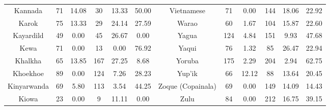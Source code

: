 \begin{tabular}{cccccccccccc}
Kannada & 71 & 14.08 & 30 & 13.33 & 50.00 & Vietnamese & 71 & 0.00 & 144 & 18.06 & 22.92 \\
Karok & 75 & 13.33 & 29 & 24.14 & 27.59 & Warao & 60 & 1.67 & 104 & 15.87 & 22.60 \\
Kayardild & 49 & 0.00 & 45 & 26.67 & 0.00 & Yagua & 124 & 4.84 & 151 & 9.93 & 47.68 \\
Kewa & 71 & 0.00 & 13 & 0.00 & 76.92 & Yaqui & 76 & 1.32 & 85 & 26.47 & 22.94 \\
Khalkha & 65 & 13.85 & 167 & 27.25 & 8.68 & Yoruba & 175 & 2.29 & 204 & 2.94 & 62.75 \\
Khoekhoe & 89 & 0.00 & 124 & 7.26 & 28.23 & Yup'ik & 66 & 12.12 & 88 & 13.64 & 20.45 \\
Kinyarwanda & 69 & 5.80 & 113 & 3.54 & 44.25 & Zoque (Copainala) & 69 & 0.00 & 149 & 14.09 & 14.43 \\
Kiowa & 23 & 0.00 & 9 & 11.11 & 0.00 & Zulu & 84 & 0.00 & 212 & 16.75 & 39.15
\end{tabular}